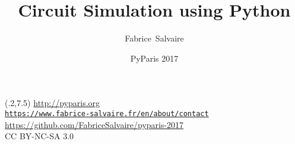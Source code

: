 





\title[]{Circuit Simulation using Python}
\author[F.~Salvaire]{Fabrice~Salvaire}
\date[13 June 17]{PyParis 2017}





%
%

\begin{frame} %
  \titlepage
  \begin{textblock}{12}(.2,7.5)
    \fontsize{5pt}{6pt}\selectfont
    \url{http://pyparis.org} \\[.5em]
    \texttt{\url{https://www.fabrice-salvaire.fr/en/about/contact}} \\ %
    \url{https://github.com/FabriceSalvaire/pyparis-2017} \\[.5em]
    CC BY-NC-SA 3.0
  \end{textblock}
\end{frame}

\logo{} %

%
%


